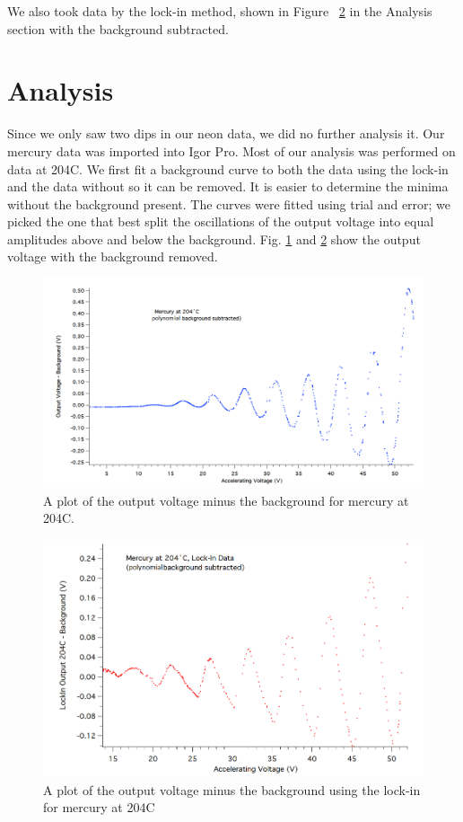 \documentclass[prb,preprint]{revtex4-1}
\begin{document}
We also took data by the lock-in method, shown in Figure ~\ref{nobacklock} in the Analysis section with the background subtracted. 

\section{Analysis}
Since we only saw two dips in our neon data, we did no further analysis it. Our mercury data was imported into Igor Pro. Most of our analysis was performed on data at 204\degree C. 
We first fit a background curve to both the data using the lock-in and the data without so it can be removed.
It is easier to determine the minima without the background present.
The curves were fitted using trial and error; we picked the one that best split the oscillations of the output voltage into equal amplitudes above and below the background. 
Fig. \ref{nobacknolock} and \ref{nobacklock} show the output voltage with the background removed. 

\begin{figure}[h!] %
\centering
\includegraphics[width=6in]{204C_noback.png}
\caption{A plot of the output voltage minus the background for mercury at 204\degree C.}
\label{nobacknolock}
\end{figure}

\begin{figure}[h!]
\centering
\includegraphics[width=6in]{204C_lockin_noback.png}
\caption{A plot of the output voltage minus the background using the lock-in for mercury at 204\degree C}
\label{nobacklock}
\end{figure}
\end{document}
